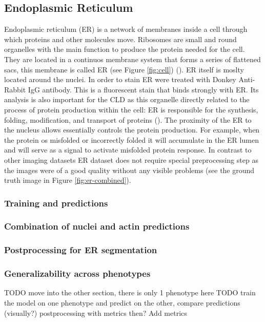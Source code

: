 \subsection{Endoplasmic Reticulum}
    Endoplasmic reticulum (ER) is a network of membranes inside a cell through which proteins and other molecules move. Ribosomes are small and round organelles with the main function to produce the protein needed for the cell. They are located in a continuos membrane system that forms a series of flattened sacs, this membrane is called ER (see Figure \ref{fig:cell}) (\cite{er}). ER itself is moslty located around the nuclei. In order to stain ER were treated with Donkey Anti-Rabbit IgG antibody. This is a fluorescent stain that binds strongly with ER. Its analysis is also important for the CLD as this organelle directly related to the process of protein production within the cell: ER is responsible for the synthesis, folding, modification, and transport of proteins (\cite{er_2}). The proximity of the ER to the nucleus allows essentially controls the protein production. For example, when the protein os misfolded or incorrectly folded it will accumulate in the ER lumen and will serve as a signal to activate misfolded protein response. In contrast to other imaging datasets ER dataset does not require special preprocessing step as the images were of a good quality without any visible problems (see the ground truth image in Figure \ref{fig:er-combined}).
    
    \subsubsection{Training and predictions}
        
    \subsubsection{Combination of nuclei and actin predictions}
        
    \subsubsection{Postprocessing for ER segmentation}
        
    \subsubsection{Generalizability across phenotypes}
        TODO move into the other section, there is only 1 phenotype here
        TODO train the model on one phenotype and predict on the other, compare predictions (visually?) 
        postprocessing with metrics then?
        Add metrics
